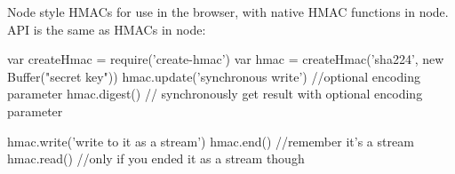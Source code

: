 \href{https://www.npmjs.org/package/create-hmac}{\tt } \href{https://travis-ci.org/crypto-browserify/createHmac}{\tt } \href{https://david-dm.org/crypto-browserify/createHmac#info=dependencies}{\tt }

\href{https://github.com/feross/standard}{\tt }

Node style H\+M\+A\+Cs for use in the browser, with native H\+M\+AC functions in node. A\+PI is the same as H\+M\+A\+Cs in node\+:


\begin{DoxyCode}
var createHmac = require('create-hmac')
var hmac = createHmac('sha224', new Buffer("secret key"))
hmac.update('synchronous write') //optional encoding parameter
hmac.digest() // synchronously get result with optional encoding parameter

hmac.write('write to it as a stream')
hmac.end() //remember it's a stream
hmac.read() //only if you ended it as a stream though
\end{DoxyCode}
 